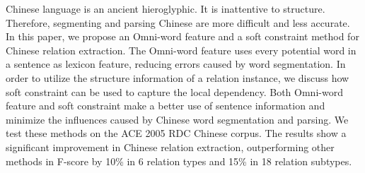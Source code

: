 Chinese language is an ancient hieroglyphic. It is inattentive to structure. Therefore, segmenting and parsing Chinese are more difficult and less accurate. In this paper, we propose an Omni-word feature and a soft constraint method for Chinese relation extraction. The Omni-word feature uses every potential word in a sentence as lexicon feature, reducing errors caused by word segmentation. In order to utilize the structure information of a relation instance, we discuss how soft constraint can be used to capture the local dependency. Both Omni-word feature and soft constraint make a better use of sentence information and minimize the influences caused by Chinese word segmentation and parsing. We test these methods on the ACE 2005 RDC Chinese corpus. The results show a significant improvement in Chinese relation extraction, outperforming other methods in F-score by 10\% in 6 relation types and 15\% in 18 relation subtypes.
